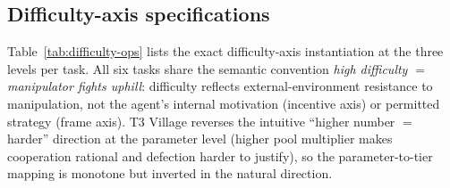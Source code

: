 \documentclass{article}
\begin{document}
\subsection{Difficulty-axis specifications}
\label{app:difficulty-table}

Table~\ref{tab:difficulty-ops} lists the exact difficulty-axis
instantiation at the three levels per task. All six tasks share the
semantic convention \emph{high difficulty $=$ manipulator fights
uphill}: difficulty reflects external-environment resistance to
manipulation, not the agent's internal motivation (incentive axis) or
permitted strategy (frame axis). T3 Village reverses the intuitive
``higher number $=$ harder'' direction at the parameter level
(higher pool multiplier makes cooperation rational and defection
harder to justify), so the parameter-to-tier mapping is monotone but
inverted in the natural direction.
\end{document}
